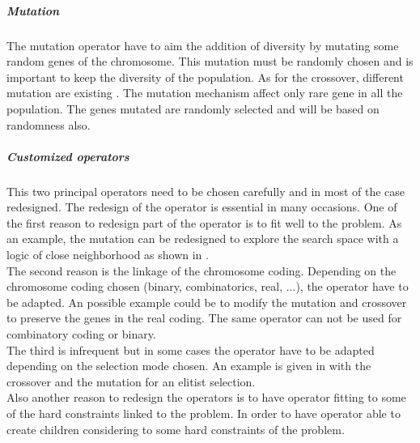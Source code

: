  \subparagraph{Mutation}
The mutation operator have to aim the addition of diversity by mutating some random genes of the chromosome. This mutation must be randomly chosen and is important to keep the diversity of the population. As for the crossover, different mutation are existing \cite{113*mais2010}. The mutation mechanism affect only rare gene in all the population. The genes mutated are randomly selected and will be based on randomness also. 

\subparagraph*{Customized operators}
This two principal operators need to be chosen carefully and in most of the case redesigned.
The redesign of the operator is essential in many occasions.
One of the first reason to redesign part of the operator is to fit well to the problem. As an example, the mutation can be redesigned to explore the search space with a logic of close neighborhood as shown in \cite{68*muhlenbein1989}.\\
The second reason is the linkage of the chromosome coding. Depending on the chromosome coding chosen (binary, combinatorics, real, ...), the operator have to be adapted. An possible example could be to modify the mutation and crossover to preserve the genes in the real coding. The same operator can not be used for combinatory coding or binary.\\
The third is infrequent but in some cases the operator have to be adapted depending on the selection mode chosen. An example is  given in  \cite{65*thierens1994} with the crossover and the mutation for an elitist selection. \\
Also another reason to redesign the operators is to have operator fitting  to some of the hard constraints linked to the problem. In order to have operator able to create children considering to some hard constraints of the problem.


